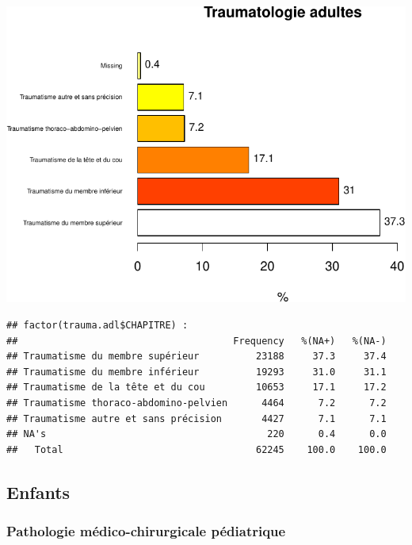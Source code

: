 \documentclass[]{article}
\newenvironment{Shaded}{\begin{snugshade}}{\end{snugshade}}
\newcommand{\KeywordTok}[1]{\textcolor[rgb]{0.13,0.29,0.53}{\textbf{{#1}}}}
\newcommand{\DataTypeTok}[1]{\textcolor[rgb]{0.13,0.29,0.53}{{#1}}}
\newcommand{\FloatTok}[1]{\textcolor[rgb]{0.00,0.00,0.81}{{#1}}}
\newcommand{\StringTok}[1]{\textcolor[rgb]{0.31,0.60,0.02}{{#1}}}
\newcommand{\NormalTok}[1]{{#1}}
\begin{document}
\includegraphics{analyse_merge_files/figure-latex/trauma_adulte-1.pdf}\\

\begin{verbatim}
## factor(trauma.adl$CHAPITRE) : 
##                                      Frequency   %(NA+)   %(NA-)
## Traumatisme du membre supérieur          23188     37.3     37.4
## Traumatisme du membre inférieur          19293     31.0     31.1
## Traumatisme de la tête et du cou         10653     17.1     17.2
## Traumatisme thoraco-abdomino-pelvien      4464      7.2      7.2
## Traumatisme autre et sans précision       4427      7.1      7.1
## NA's                                       220      0.4      0.0
##   Total                                  62245    100.0    100.0
\end{verbatim}

\subsection{Enfants}\label{enfants}

\subsubsection{Pathologie médico-chirurgicale
pédiatrique}\label{pathologie-medico-chirurgicale-pediatrique}

\begin{Shaded}
\end{Shaded}
\end{document}
